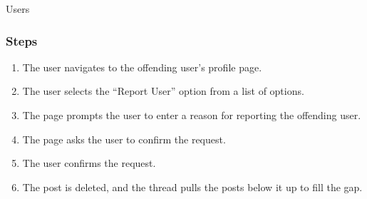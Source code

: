 \documentclass[12pt]{scrartcl}
\begin{document}
Users

\subsubsection{Steps}

\begin{enumerate}
\item The user navigates to the offending user’s profile page.
\item The user selects the “Report User” option from a list of options.
\item The page prompts the user to enter a reason for reporting the offending user.
\item The page asks the user to confirm the request.
\item The user confirms the request.
\item The post is deleted, and the thread pulls the posts below it up to fill the gap.
\end{enumerate}
\end{document}
